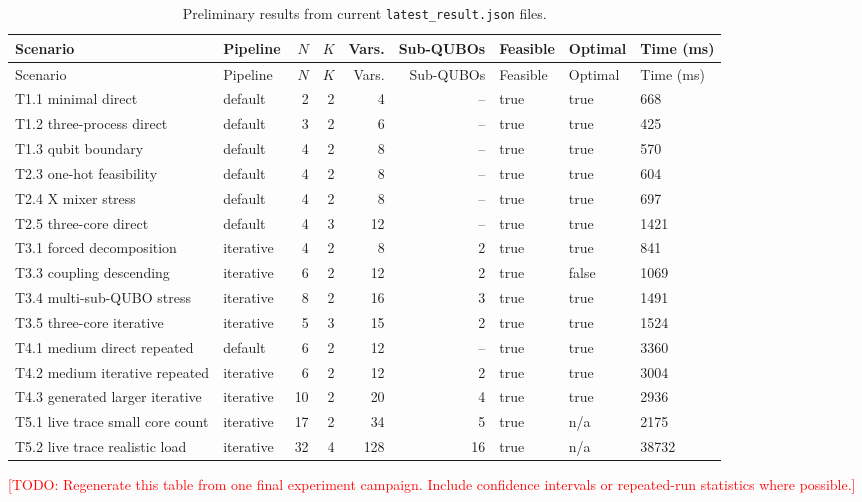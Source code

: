 \documentclass[12pt,a4paper,oneside]{report}
\newcommand{\todo}[1]{\textcolor{red}{[TODO: #1]}}
\begin{document}
\begin{longtable}{p{24mm}p{19mm}rrrrp{18mm}p{18mm}p{20mm}}
  \caption{Preliminary results from current \texttt{latest\_result.json} files.}
  \label{tab:preliminary-results}\\
  \toprule
  Scenario & Pipeline & \(N\) & \(K\) & Vars. & Sub-QUBOs & Feasible & Optimal & Time (ms) \\
  \midrule
  \endfirsthead
  \toprule
  Scenario & Pipeline & \(N\) & \(K\) & Vars. & Sub-QUBOs & Feasible & Optimal & Time (ms) \\
  \midrule
  \endhead
  T1.1 minimal direct & default & 2 & 2 & 4 & -- & true & true & 668 \\
  T1.2 three-process direct & default & 3 & 2 & 6 & -- & true & true & 425 \\
  T1.3 qubit boundary & default & 4 & 2 & 8 & -- & true & true & 570 \\
  T2.3 one-hot feasibility & default & 4 & 2 & 8 & -- & true & true & 604 \\
  T2.4 X mixer stress & default & 4 & 2 & 8 & -- & true & true & 697 \\
  T2.5 three-core direct & default & 4 & 3 & 12 & -- & true & true & 1421 \\
  T3.1 forced decomposition & iterative & 4 & 2 & 8 & 2 & true & true & 841 \\
  T3.3 coupling descending & iterative & 6 & 2 & 12 & 2 & true & false & 1069 \\
  T3.4 multi-sub-QUBO stress & iterative & 8 & 2 & 16 & 3 & true & true & 1491 \\
  T3.5 three-core iterative & iterative & 5 & 3 & 15 & 2 & true & true & 1524 \\
  T4.1 medium direct repeated & default & 6 & 2 & 12 & -- & true & true & 3360 \\
  T4.2 medium iterative repeated & iterative & 6 & 2 & 12 & 2 & true & true & 3004 \\
  T4.3 generated larger iterative & iterative & 10 & 2 & 20 & 4 & true & true & 2936 \\
  T5.1 live trace small core count & iterative & 17 & 2 & 34 & 5 & true & n/a & 2175 \\
  T5.2 live trace realistic load & iterative & 32 & 4 & 128 & 16 & true & n/a & 38732 \\
  \bottomrule
\end{longtable}

\todo{Regenerate this table from one final experiment campaign. Include
confidence intervals or repeated-run statistics where possible.}
\end{document}
